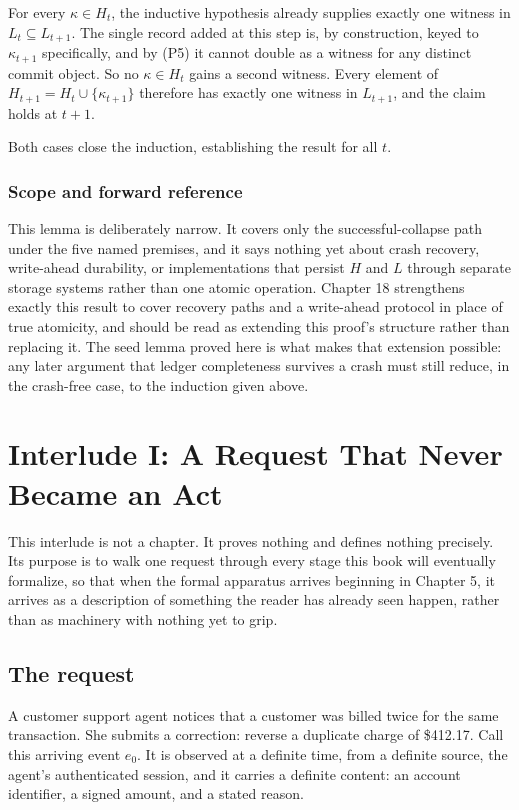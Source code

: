 \documentclass[11pt,openany]{book}
\newcommand{\interlude}{\cleardoublepage}
\begin{document}
For every \(\kappa\in H_t\), the inductive hypothesis already supplies exactly
one witness in \(L_t\subseteq L_{t+1}\). The single record added at this step
is, by construction, keyed to \(\kappa_{t+1}\) specifically, and by (P5) it
cannot double as a witness for any distinct commit object. So no
\(\kappa\in H_t\) gains a second witness. Every element of
\(H_{t+1}=H_t\cup\{\kappa_{t+1}\}\) therefore has exactly one witness in
\(L_{t+1}\), and the claim holds at \(t+1\).

Both cases close the induction, establishing the result for all \(t\).

\subsection{Scope and forward reference}

This lemma is deliberately narrow. It covers only the successful-collapse path
under the five named premises, and it says nothing yet about crash recovery,
write-ahead durability, or implementations that persist \(H\) and \(L\)
through separate storage systems rather than one atomic operation. Chapter 18
strengthens exactly this result to cover recovery paths and a write-ahead
protocol in place of true atomicity, and should be read as extending this
proof's structure rather than replacing it. The seed lemma proved here is what
makes that extension possible: any later argument that ledger completeness
survives a crash must still reduce, in the crash-free case, to the induction
given above.

\interlude
\chapter*{Interlude I: A Request That Never Became an Act}

This interlude is not a chapter. It proves nothing and defines nothing
precisely. Its purpose is to walk one request through every stage this book
will eventually formalize, so that when the formal apparatus arrives beginning
in Chapter 5, it arrives as a description of something the reader has already
seen happen, rather than as machinery with nothing yet to grip.

\section*{The request}

A customer support agent notices that a customer was billed twice for the same
transaction. She submits a correction: reverse a duplicate charge of
\$412.17. Call this arriving event \(e_0\). It is observed at a definite time,
from a definite source, the agent's authenticated session, and it carries a
definite content: an account identifier, a signed amount, and a stated reason.
\end{document}
